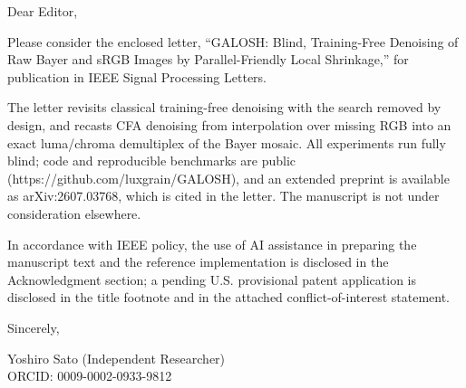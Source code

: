 \documentclass[11pt]{article}
\begin{document}
Dear Editor,

\bigskip
Please consider the enclosed letter, ``GALOSH: Blind, Training-Free Denoising
of Raw Bayer and sRGB Images by Parallel-Friendly Local Shrinkage,'' for
publication in IEEE Signal Processing Letters.

The letter revisits classical training-free denoising with the search removed
by design, and recasts CFA denoising from interpolation over missing RGB into
an exact luma/chroma demultiplex of the Bayer mosaic. All experiments run
fully blind; code and reproducible benchmarks are public
(https://github.com/luxgrain/GALOSH), and an extended preprint is available as
arXiv:2607.03768, which is cited in the letter. The manuscript is not under
consideration elsewhere.

In accordance with IEEE policy, the use of AI assistance in preparing the
manuscript text and the reference implementation is disclosed in the
Acknowledgment section; a pending U.S. provisional patent application is
disclosed in the title footnote and in the attached conflict-of-interest
statement.

\bigskip
Sincerely,

Yoshiro Sato (Independent Researcher)\\
ORCID: 0009-0002-0933-9812
\end{document}
